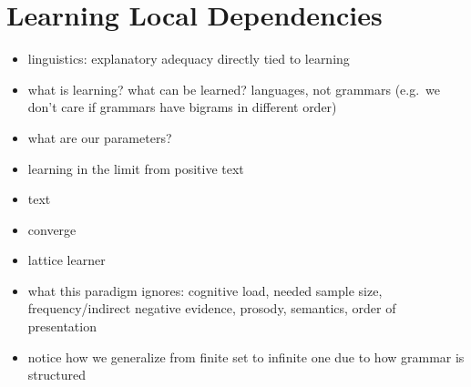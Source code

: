 \chapter{Learning Local Dependencies}
\label{cha:LearnSL}

\begin{itemize}
    \item linguistics: explanatory adequacy directly tied to learning
    \item what is learning? what can be learned? languages, not grammars (e.g.\ we don't care if grammars have bigrams in different order)
    \item what are our parameters?
    \item learning in the limit from positive text
    \item text
    \item converge
    \item lattice learner
    \item what this paradigm ignores: cognitive load, needed sample size, frequency/indirect negative evidence, prosody, semantics, order of presentation
    \item notice how we generalize from finite set to infinite one due to how grammar is structured
\end{itemize}
